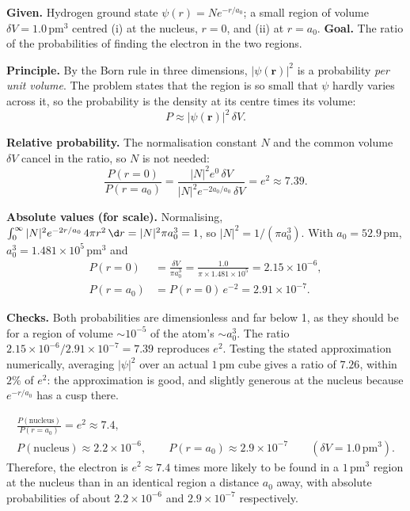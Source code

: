 \begin{solutionbox}
\textbf{Given.} Hydrogen ground state $\psi(r)=N e^{-r/a_0}$; a small region of volume $\delta V=1.0\,\mathrm{pm}^3$ centred (i) at the nucleus, $r=0$, and (ii) at $r=a_0$. \textbf{Goal.} The ratio of the probabilities of finding the electron in the two regions.

\textbf{Principle.} By the Born rule in three dimensions, $|\psi(\mathbf r)|^2$ is a probability \emph{per unit volume}. The problem states that the region is so small that $\psi$ hardly varies across it, so the probability is the density at its centre times its volume:
\[
P\approx|\psi(\mathbf r)|^2\,\delta V .
\]

\textbf{Relative probability.} The normalisation constant $N$ and the common volume $\delta V$ cancel in the ratio, so $N$ is not needed:
\[
\frac{P(r=0)}{P(r=a_0)}=\frac{|N|^2e^{0}\,\delta V}{|N|^2e^{-2a_0/a_0}\,\delta V}=e^{2}\approx7.39 .
\]

\textbf{Absolute values (for scale).} Normalising, $\int_0^\infty|N|^2e^{-2r/a_0}\,4\pi r^2\,\d r=|N|^2\pi a_0^3=1$, so $|N|^2=1/(\pi a_0^3)$. With $a_0=52.9\,\mathrm{pm}$, $a_0^3=1.481\times10^{5}\,\mathrm{pm}^3$ and
\begin{align*}
P(r=0)&=\frac{\delta V}{\pi a_0^3}=\frac{1.0}{\pi\times1.481\times10^{5}}=2.15\times10^{-6},\\
P(r=a_0)&=P(r=0)\,e^{-2}=2.91\times10^{-7}.
\end{align*}

\textbf{Checks.} Both probabilities are dimensionless and far below 1, as they should be for a region of volume $\sim10^{-5}$ of the atom's $\sim a_0^3$. The ratio $2.15\times10^{-6}/2.91\times10^{-7}=7.39$ reproduces $e^2$. Testing the stated approximation numerically, averaging $|\psi|^2$ over an actual $1\,\mathrm{pm}$ cube gives a ratio of $7.26$, within $2\%$ of $e^2$: the approximation is good, and slightly generous at the nucleus because $e^{-r/a_0}$ has a cusp there.
\end{solutionbox}

\begin{answerbox}
\begin{gather*}
\frac{P(\text{nucleus})}{P(r=a_0)}=e^{2}\approx7.4,\\
P(\text{nucleus})\approx2.2\times10^{-6},\qquad P(r=a_0)\approx2.9\times10^{-7}\qquad(\delta V=1.0\,\mathrm{pm}^3).
\end{gather*}
Therefore, the electron is $e^2\approx7.4$ times more likely to be found in a $1\,\mathrm{pm}^3$ region at the nucleus than in an identical region a distance $a_0$ away, with absolute probabilities of about $2.2\times10^{-6}$ and $2.9\times10^{-7}$ respectively.
\end{answerbox}

